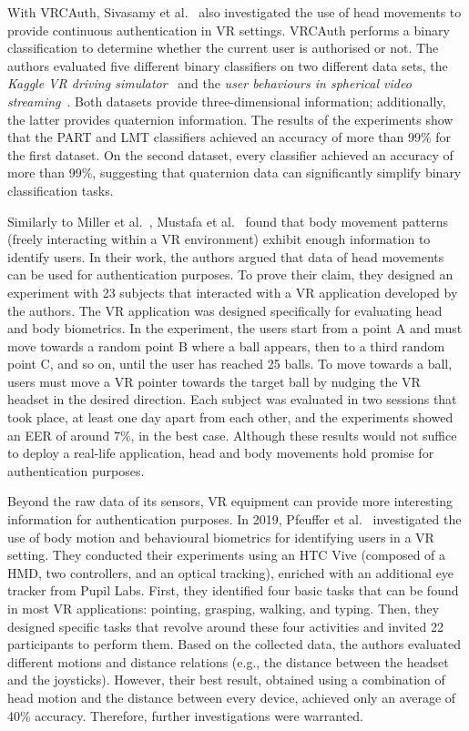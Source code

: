 \documentclass[journal]{IEEEtran}
\begin{document}
With VRCAuth, Sivasamy et al.~\cite{sivasamy2020} also investigated the use of head movements to provide continuous authentication in VR settings. VRCAuth performs a binary classification to determine whether the current user is authorised or not. The authors evaluated five different binary classifiers on two different data sets, the \textit{Kaggle VR driving simulator}~\cite{jafarnejad2017} and the \textit{user behaviours in spherical video streaming}~\cite{wu2017}. Both datasets provide three-dimensional information; additionally, the latter provides quaternion information. The results of the experiments show that the PART and LMT classifiers achieved an accuracy of more than 99\% for the first dataset. On the second dataset, every classifier achieved an accuracy of more than 99\%, suggesting that quaternion data can significantly simplify binary classification tasks.

Similarly to Miller et al.~\cite{miller2020personal}, Mustafa et al.~\cite{mustafa2018} found that body movement patterns (freely interacting within a VR environment) exhibit enough information to identify users. In their work, the authors argued that data of head movements can be used for authentication purposes. To prove their claim, they designed an experiment with 23 subjects that interacted with a VR application developed by the authors. The VR application was designed specifically for evaluating head and body biometrics. In the experiment, the users start from a point A and must move towards a random point B where a ball appears, then to a third random point C, and so on, until the user has reached 25 balls. To move towards a ball, users must move a VR pointer towards the target ball by nudging the VR headset in the desired direction. Each subject was evaluated in two sessions that took place, at least one day apart from each other, and the experiments showed an EER of around 7\%, in the best case. Although these results would not suffice to deploy a real-life application, head and body movements hold promise for authentication purposes.

Beyond the raw data of its sensors, VR equipment can provide more interesting information for authentication purposes. In 2019, Pfeuffer et al.~\cite{pfeuffer2019} investigated the use of body motion and behavioural biometrics for identifying users in a VR setting. They conducted their experiments using an HTC Vive (composed of a HMD, two controllers, and an optical tracking), enriched with an additional eye tracker from Pupil Labs. First, they identified four basic tasks that can be found in most VR applications: pointing, grasping, walking, and typing. Then, they designed specific tasks that revolve around these four activities and invited 22 participants to perform them. Based on the collected data, the authors evaluated different motions and distance relations (e.g., the distance between the headset and the joysticks). However, their best result, obtained using a combination of head motion and the distance between every device, achieved only an average of 40\% accuracy. Therefore, further investigations were warranted.
\end{document}
